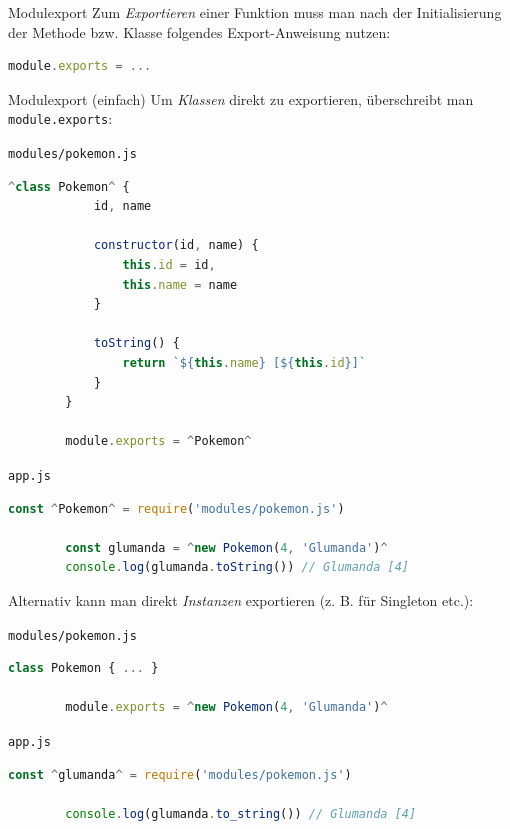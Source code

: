 \begin{defi}{Modulexport}
    Zum \emph{Exportieren} einer Funktion muss man nach der Initialisierung der Methode bzw. Klasse folgendes Export-Anweisung nutzen:
    \begin{lstlisting}[language=JavaScript]
        module.exports = ...
    \end{lstlisting}
\end{defi}

\begin{example}{Modulexport (einfach)}
    Um \emph{Klassen} direkt zu exportieren, überschreibt man \texttt{module.exports}:

    \texttt{modules/pokemon.js}
    \begin{lstlisting}[language=JavaScript]
        ^class Pokemon^ {
            id, name

            constructor(id, name) {
                this.id = id,
                this.name = name
            }

            toString() {
                return `${this.name} [${this.id}]`
            }
        }

        module.exports = ^Pokemon^
    \end{lstlisting}

    \texttt{app.js}
    \begin{lstlisting}[language=JavaScript]
        const ^Pokemon^ = require('modules/pokemon.js')

        const glumanda = ^new Pokemon(4, 'Glumanda')^
        console.log(glumanda.toString()) // Glumanda [4]
    \end{lstlisting}

    Alternativ kann man direkt \emph{Instanzen} exportieren (z. B. für Singleton etc.):

    \texttt{modules/pokemon.js}
    \begin{lstlisting}[language=JavaScript]
        class Pokemon { ... }

        module.exports = ^new Pokemon(4, 'Glumanda')^
    \end{lstlisting}

    \texttt{app.js}
    \begin{lstlisting}[language=JavaScript]
        const ^glumanda^ = require('modules/pokemon.js')

        console.log(glumanda.to_string()) // Glumanda [4]
    \end{lstlisting}
\end{example}

